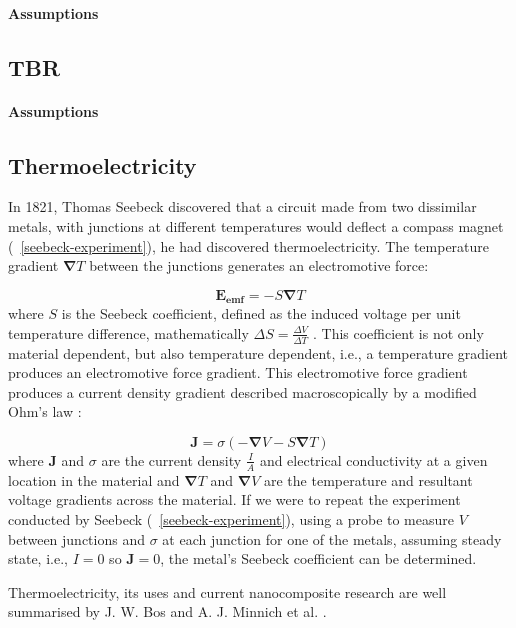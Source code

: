 \documentclass[12pt,titlepage,draft]{article}
\newcommand{\figref}[2][\figurename~]{#1\ref{#2}}
\renewcommand{\vec}[1]{\mathbf{#1}}
\begin{document}
\paragraph{Assumptions}
\subsection{TBR}
\paragraph{Assumptions}

\subsection{Thermoelectricity}
In 1821, Thomas Seebeck discovered that a circuit made from two
dissimilar metals, with junctions at different temperatures would
deflect a compass magnet (\figref{seebeck-experiment}), he had
discovered thermoelectricity. The temperature gradient $\vec{\nabla}
T$ between the junctions generates an electromotive force:

\begin{equation}
\label{seebeck-emf}
	\vec{E_{emf}} = -S \vec{\nabla} T
\end{equation}
where $S$ is the Seebeck coefficient, defined as the induced voltage per
unit temperature difference, mathematically $\Delta S = \frac{\Delta
V}{\Delta T}$ \cite{auparay}. This coefficient is not only material
dependent, but also temperature dependent, i.e., a temperature gradient
produces an electromotive force gradient. This electromotive force
gradient produces a current density gradient described macroscopically
by a modified Ohm's law \cite{ziman}:

\begin{equation}
\label{current-density}
	\vec{J} = \sigma (-\vec{\nabla} V - S \vec{\nabla} T)
\end{equation}
where $\vec{J}$ and $\sigma$ are the current density $\frac{I}{A}$ and
electrical conductivity at a given location in the material and
$\vec{\nabla} T$ and $\vec{\nabla} V$ are the temperature and
resultant voltage gradients across the material. If we were to repeat the
experiment conducted by Seebeck (\figref{seebeck-experiment}), using a
probe to measure $V$ between junctions and $\sigma$ at each junction
for one of the metals, assuming steady state, i.e., $I=0$ so $\vec{J} = 0$, the metal's Seebeck coefficient can be determined.

Thermoelectricity, its uses and current nanocomposite research are well
summarised by J. W. Bos \cite{bos-review} and A. J. Minnich et al.
\cite{minnich-review}.
\end{document}
